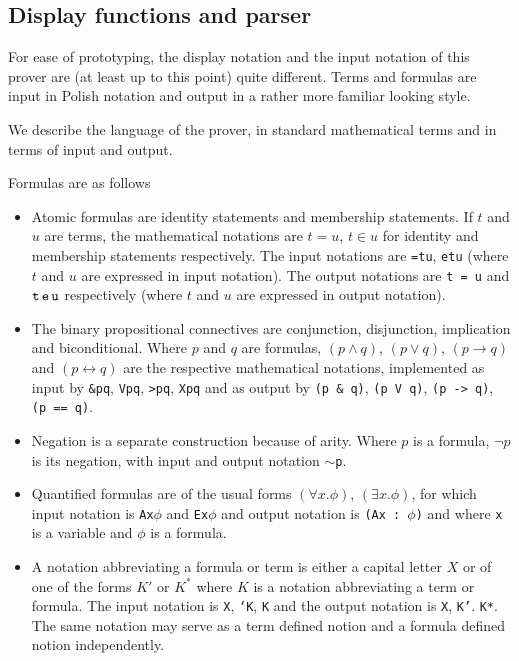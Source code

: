 \documentclass{article}
\begin{document}
\subsection{Display functions and parser}

For ease of prototyping, the display notation and the input notation of this prover are (at least up to this point)
quite different.  Terms and formulas are input in Polish notation and output in a rather more familiar looking style.

We describe the language of the prover, in standard mathematical terms and in terms of input and output.

Formulas are as follows

\begin{itemize}

\item  Atomic formulas are identity statements and membership statements.  If $t$ and $u$ are terms, the mathematical notations are $t=u$, $t \in u$ for identity and membership statements respectively.  The input notations are
{\tt =tu}, {\tt etu} (where $t$ and $u$ are expressed in input notation).  The output notations are {\tt t = u} and ${\tt t \, e \, u}$ respectively (where $t$ and $u$ are expressed in output notation).

\item  The binary propositional connectives are conjunction, disjunction, implication and biconditional.  Where $p$ and $q$ are formulas, $(p \wedge q)$, $(p \vee q)$, $(p \rightarrow q)$ and $(p \leftrightarrow q)$ are the respective mathematical notations, implemented as input by {\tt \&pq}, {\tt Vpq}, {\tt >pq}, {\tt Xpq} and as output by\newline
{\tt (p \& q)}, {\tt (p V q)}, {\tt (p -> q)}, {\tt (p == q)}.

\item  Negation is a separate construction because of arity.   Where $p$ is a formula, $\neg p$ is its negation, with 
input and output notation {\tt $\sim$p}.

\item  Quantified formulas are of the usual forms $(\forall x.\phi)$, $(\exists x.\phi)$, for which input notation
is {\tt Ax$\phi$} and {\tt Ex$\phi$} and output notation is {\tt (Ax : $\phi$)} and  where {\tt x} is a variable and $\phi$ is a formula.

\item  A notation abbreviating a formula or term is either a capital letter $X$ or of one of the forms $K'$ or $K^*$ where
$K$ is a notation abbreviating a term or formula.  The input notation is {\tt X}, {\tt `K}, {\tt *K} and the output notation
is {\tt X}, {\tt K'}. {\tt K*}.  The same notation may serve as a term defined notion and a formula defined notion independently.


\end{itemize}
\end{document}
